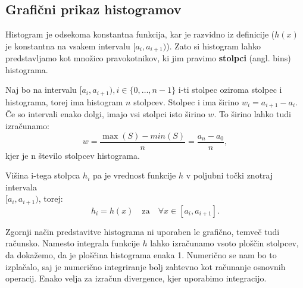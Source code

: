 \subsection{Grafični prikaz histogramov}

Histogram je odsekoma konstantna funkcija, kar je razvidno iz definicije ($h(x)$ je konstantna na vsakem intervalu $[a_i, a_{i+1})$). Zato si histogram lahko predstavljamo kot množico pravokotnikov, ki jim pravimo \textbf{stolpci} (angl. bins) histograma.

Naj bo na intervalu $[a_{i}, a_{i+1}), i \in \{0,\ldots,n-1\}$ i-ti stolpec oziroma stolpec i histograma, torej ima histogram $n$ stolpcev. Stolpec i ima širino $w_i = a_{i+1} - a_{i}$. Če so intervali enako dolgi, imajo vsi stolpci isto širino $w$. To širino lahko tudi izračunamo:
\begin{equation}\label{sirina_stevilo}
    w = \frac{\max(S)-min(S)}{n} = \frac{a_n - a_0}{n},
\end{equation}
kjer je n število stolpcev histograma.

Višina i-tega stolpca $h_i$ pa je vrednost funkcije $h$ v poljubni točki znotraj intervala \\ $[a_{i}, a_{i+1})$, torej:
\begin{equation}
    h_i = h(x) \quad \text{za} \quad \forall  x \in [a_{i}, a_{i+1}].
\end{equation}

Zgornji način predstavitve histograma ni uporaben le grafično, temveč tudi računsko. Namesto integrala funkcije $h$ lahko izračunamo vsoto ploščin stolpcev, da dokažemo, da je ploščina histograma enaka 1. Numerično se nam bo to izplačalo, saj je numerično integriranje bolj zahtevno kot računanje osnovnih operacij. Enako velja za izračun divergence, kjer uporabimo integracijo.